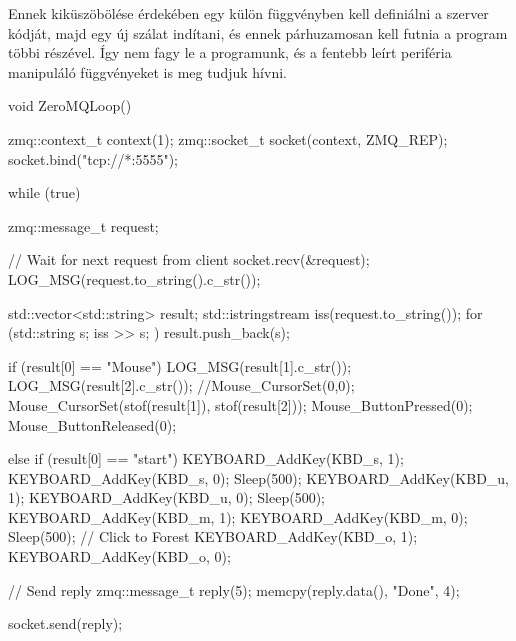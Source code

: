 Ennek kiküszöbölése érdekében egy külön függvényben kell definiálni a szerver kódját, majd egy új szálat indítani, és ennek párhuzamosan kell futnia a program többi részével. Így nem fagy le a programunk, és a fentebb leírt periféria manipuláló függvényeket is meg tudjuk hívni.
\pagebreak
\begin{cpp}

    void ZeroMQLoop()
    {
    
        zmq::context_t context(1);
        zmq::socket_t socket(context, ZMQ_REP);
        socket.bind("tcp://*:5555");
    
        while (true) {
            zmq::message_t request;
    
            //  Wait for next request from client
            socket.recv(&request);
            LOG_MSG(request.to_string().c_str());
    
            std::vector<std::string> result;
            std::istringstream iss(request.to_string());
            for (std::string s; iss >> s; )
                result.push_back(s);
    
            if (result[0] == "Mouse")
            {
                LOG_MSG(result[1].c_str());
                LOG_MSG(result[2].c_str());
                //Mouse_CursorSet(0,0);
                Mouse_CursorSet(stof(result[1]), stof(result[2]));
                Mouse_ButtonPressed(0);
                Mouse_ButtonReleased(0);
            }
    
            else if (result[0] == "start")
            {
                KEYBOARD_AddKey(KBD_s, 1);
                KEYBOARD_AddKey(KBD_s, 0);
                Sleep(500);
                KEYBOARD_AddKey(KBD_u, 1);
                KEYBOARD_AddKey(KBD_u, 0);
                Sleep(500);
                KEYBOARD_AddKey(KBD_m, 1);
                KEYBOARD_AddKey(KBD_m, 0);
                Sleep(500);
                // Click to Forest
                KEYBOARD_AddKey(KBD_o, 1);
                KEYBOARD_AddKey(KBD_o, 0);
            }
    
            //  Send reply
            zmq::message_t reply(5);
            memcpy(reply.data(), "Done", 4);
            
            socket.send(reply);
        }
    }

    
\end{cpp}
